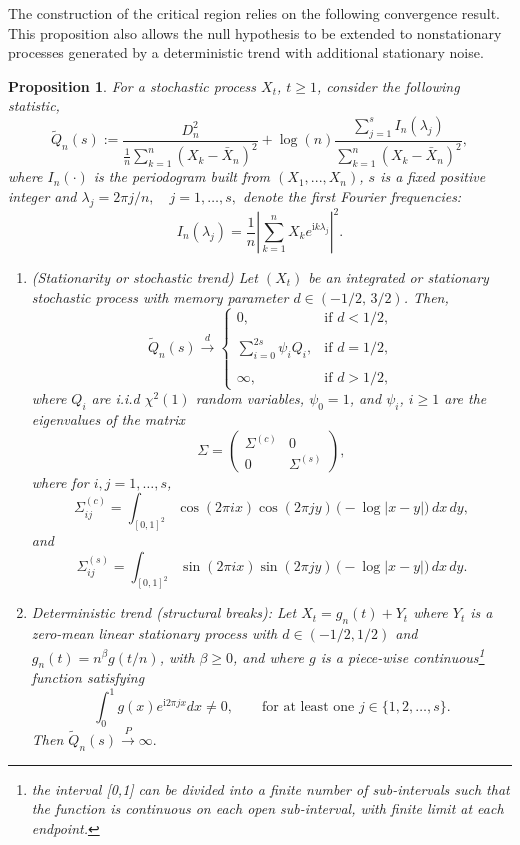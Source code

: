 \documentclass[12pt]{article}
\numberwithin{equation}{section}
\newtheorem{prop}{Proposition}[section]
\def\i{\mathrm{i}}
\begin{document}
The construction of the critical region relies on the following convergence result. This proposition also allows the null hypothesis to be extended to nonstationary processes generated by a deterministic trend with additional stationary noise.
\begin{prop}\label{periodogram variance}
 For a stochastic process $X_t$, $t\ge1$, consider the following statistic,
 $$
 \tilde Q_n(s):=\frac{D_n^2}{\frac{1}{n}{\displaystyle\sum_{k=1}^n(X_k-\bar X_n)^2}}
  +\log (n)\displaystyle\frac{\sum_{j=1}^sI_n(\lambda_j)}{\displaystyle\sum_{k=1}^n(X_k-\bar X_n)^2},
 $$
where $I_n(\cdot)$ is the periodogram  built from $(X_1,...,X_n)$,  $s$ is a fixed positive integer and $ \lambda_j=2\pi j/n, \quad j=1,\ldots,s,$ denote the first Fourier frequencies:
\begin{equation}\label{non standard perio}
I_n(\lambda_j)=\frac{1}{n}\left\vert\sum_{k=1}^nX_ke^{\i k\lambda_j}\right\vert^2.
\end{equation}

\begin{enumerate}
    \item (Stationarity or stochastic trend)
Let $(X_t)$ be an integrated or stationary  stochastic process with memory parameter $d \in (-1/2,\,3/2)$. Then, 
$$
\tilde Q_n(s)\overset{d}{\rightarrow}\begin{cases}
0,&\textrm{if }d<1/2,\\\\
\displaystyle\sum_{i=0}^{2s}\psi_iQ_i,&\textrm{if }d=1/2,\\\\
\infty,&\textrm{if }d>1/2,
\end{cases}
$$
where $Q_i$ are i.i.d $\chi^2(1)$ random variables, $\psi_0=1$, and $\psi_i$, $i\ge1$ are the eigenvalues of the matrix
\begin{equation}\label{Sigma variance}
\Sigma =
\begin{pmatrix}
\Sigma^{(c)} & 0\\[3pt]
0 &\Sigma^{(s)}
\end{pmatrix},
\end{equation}
where for 
 $i,j=1,\ldots,s$, 
\[
\Sigma^{(c)}_{ij} =
\int_{[0,1]^2}\!\cos(2\pi i x)\cos(2\pi j y)\,
\bigl(-\log|x-y|\bigr)\,dx\,dy,
\]
and
$$
\Sigma^{(s)}_{ij} =
\int_{[0,1]^2}\!\sin(2\pi i x)\sin(2\pi j y)\,
\bigl(-\log|x-y|\bigr)\,dx\,dy.
$$
\item Deterministic trend (structural breaks):  Let $X_t=g_n(t)+Y_t$ where  $Y_t$ is a zero-mean linear stationary process with $d\in(-1/2,1/2)$ and $g_n(t)=n^\beta g(t/n)$, with $\beta\ge0$, and where $g$ is a piece-wise continuous\footnote{the interval [0,1] can be divided into a finite number of sub-intervals such that the function is continuous on each open sub-interval, with finite limit at each endpoint.}   function satisfying  
\begin{equation}\label{nonzero}
\int_0^1g(x)e^{\i 2\pi jx}dx\neq0, \qquad\textrm{for at least one }j\in\{1,2,\ldots,s\}.
\end{equation}
Then $\tilde Q_n(s)\overset{P}{\to}\infty.$
\end{enumerate}
\end{prop}
\end{document}

